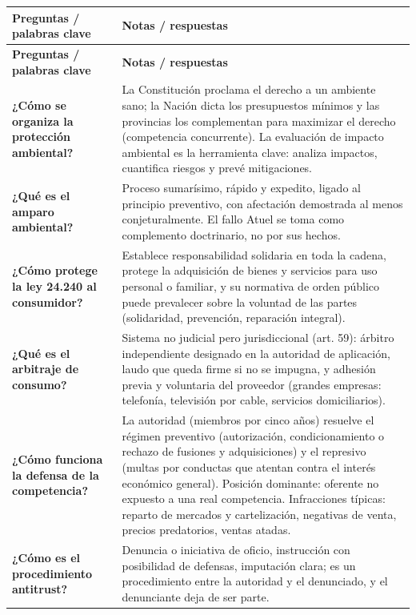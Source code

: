 \documentclass[12pt,oneside]{book}
\begin{document}
\begin{longtable}{@{}p{}p{}@{}}
\toprule
\textbf{Preguntas / palabras clave} & \textbf{Notas / respuestas} \\
\midrule
\endfirsthead
\toprule
\textbf{Preguntas / palabras clave} & \textbf{Notas / respuestas} \\
\midrule
\endhead

\textbf{¿Cómo se organiza la protección ambiental?} &
La Constitución proclama el derecho a un ambiente sano; la Nación dicta los presupuestos mínimos y las provincias los complementan para maximizar el derecho (competencia concurrente). La evaluación de impacto ambiental es la herramienta clave: analiza impactos, cuantifica riesgos y prevé mitigaciones. \\[0.8em]

\textbf{¿Qué es el amparo ambiental?} &
Proceso sumarísimo, rápido y expedito, ligado al principio preventivo, con afectación demostrada al menos conjeturalmente. El fallo Atuel se toma como complemento doctrinario, no por sus hechos. \\[0.8em]

\textbf{¿Cómo protege la ley 24.240 al consumidor?} &
Establece responsabilidad solidaria en toda la cadena, protege la adquisición de bienes y servicios para uso personal o familiar, y su normativa de orden público puede prevalecer sobre la voluntad de las partes (solidaridad, prevención, reparación integral). \\[0.8em]

\textbf{¿Qué es el arbitraje de consumo?} &
Sistema no judicial pero jurisdiccional (art. 59): árbitro independiente designado en la autoridad de aplicación, laudo que queda firme si no se impugna, y adhesión previa y voluntaria del proveedor (grandes empresas: telefonía, televisión por cable, servicios domiciliarios). \\[0.8em]

\textbf{¿Cómo funciona la defensa de la competencia?} &
La autoridad (miembros por cinco años) resuelve el régimen preventivo (autorización, condicionamiento o rechazo de fusiones y adquisiciones) y el represivo (multas por conductas que atentan contra el interés económico general). Posición dominante: oferente no expuesto a una real competencia. Infracciones típicas: reparto de mercados y cartelización, negativas de venta, precios predatorios, ventas atadas. \\[0.8em]

\textbf{¿Cómo es el procedimiento antitrust?} &
Denuncia o iniciativa de oficio, instrucción con posibilidad de defensas, imputación clara; es un procedimiento entre la autoridad y el denunciado, y el denunciante deja de ser parte. \\


\end{longtable}
\end{document}
